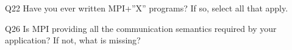 \begin{description}%
\item{Q22} Have you ever written MPI+”X” programs? If so, select all that apply.%
\item{Q26} Is MPI providing all the communication semantics required by your application? If not, what is missing?%
\end{description}%
